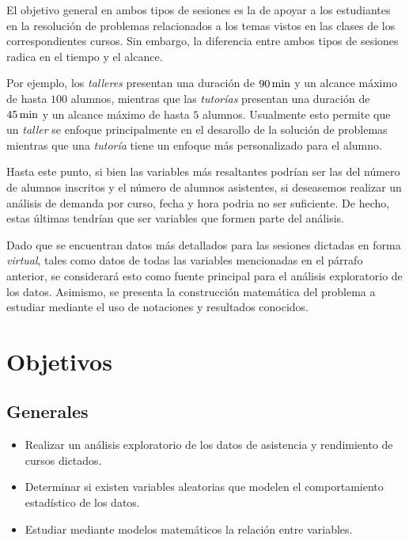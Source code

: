 \documentclass[11pt,a4paper]{book}
\theoremstyle{definition}%
\begin{document}
        El objetivo general en ambos tipos de sesiones es la de apoyar a los estudiantes en la resolución de problemas relacionados a los temas vistos en las clases de los correspondientes cursos. Sin embargo, la diferencia entre ambos tipos de sesiones radica en el tiempo y el alcance.
        
        Por ejemplo, los \textit{talleres} presentan una duración de $90\,\textup{min}$ y un alcance máximo de hasta $100$ alumnos, mientras que las \textit{tutorías} presentan una duración de $45\,\textup{min}$ y un alcance máximo de hasta $5$ alumnos. Usualmente esto permite que un \textit{taller} se enfoque principalmente en el desarollo de la solución de problemas mientras que una \textit{tutoría} tiene un enfoque más personalizado para el alumno.

        Hasta este punto, si bien las variables más resaltantes podrían ser las del número de alumnos inscritos y el número de alumnos asistentes, si deseasemos realizar un análisis de demanda por curso, fecha y hora podria no ser suficiente. De hecho, estas últimas tendrían que ser variables que formen parte del análisis.

        Dado que se encuentran datos más detallados para las sesiones dictadas en forma \textit{virtual}, tales como datos de todas las variables mencionadas en el párrafo anterior, se considerará esto como fuente principal para el análisis exploratorio de los datos. Asimismo, se presenta la construcción matemática del problema a estudiar mediante el uso de notaciones y resultados conocidos.          
            
        \chapter{Objetivos}
            \section{Generales}
                \begin{itemize}
                    \item Realizar un análisis exploratorio de los datos de asistencia y rendimiento de cursos dictados.
                    \item Determinar si existen variables aleatorias que modelen el comportamiento estadístico de los datos.
                    \item Estudiar mediante modelos matemáticos la relación entre variables.
                \end{itemize}
\end{document}

